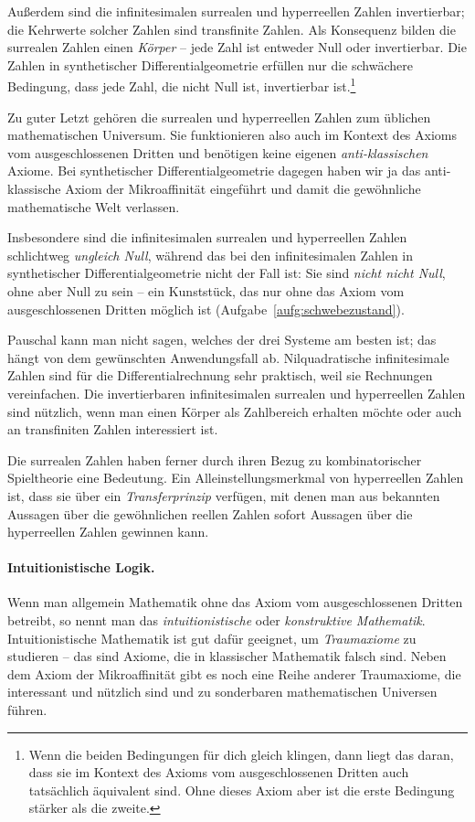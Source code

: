 \documentclass[twoside]{../zirkelblatt}
\theoremstyle{definition}
\theoremstyle{plain}
\theoremstyle{remark}
\begin{document}
Außerdem sind die infinitesimalen surrealen und hyperreellen Zahlen
invertierbar; die Kehrwerte solcher Zahlen sind transfinite Zahlen. Als
Konsequenz bilden die surrealen Zahlen einen \emph{Körper} -- jede Zahl ist
entweder Null oder invertierbar. Die Zahlen in synthetischer
Differentialgeometrie erfüllen nur die schwächere Bedingung, dass jede Zahl, die
nicht Null ist, invertierbar ist.\footnote{Wenn die beiden Bedingungen für dich
gleich klingen, dann liegt das daran, dass sie im Kontext des Axioms vom
ausgeschlossenen Dritten auch tatsächlich äquivalent sind. Ohne dieses Axiom
aber ist die erste Bedingung stärker als die zweite.}

Zu guter Letzt gehören die surrealen und hyperreellen Zahlen zum üblichen
mathematischen Universum. Sie funktionieren also auch im Kontext des Axioms vom
ausgeschlossenen Dritten und benötigen keine eigenen \emph{anti-klassischen}
Axiome. Bei synthetischer Differentialgeometrie dagegen haben wir ja das
anti-klassische Axiom der Mikroaffinität eingeführt und damit die gewöhnliche
mathematische Welt verlassen.

Insbesondere sind die infinitesimalen surrealen
und hyperreellen Zahlen schlichtweg \emph{ungleich Null}, während das bei den
infinitesimalen Zahlen in synthetischer Differentialgeometrie nicht der Fall
ist: Sie sind \emph{nicht nicht Null}, ohne aber Null zu sein -- ein
Kunststück, das nur ohne das Axiom vom ausgeschlossenen Dritten möglich ist
(Aufgabe~\ref{aufg:schwebezustand}).

Pauschal kann man nicht sagen, welches der drei Systeme am besten ist; das
hängt von dem gewünschten Anwendungsfall ab. Nilquadratische infinitesimale
Zahlen sind für die Differentialrechnung sehr praktisch, weil sie Rechnungen
vereinfachen. Die invertierbaren infinitesimalen surrealen und hyperreellen
Zahlen sind nützlich, wenn man einen Körper als Zahlbereich erhalten möchte
oder auch an transfiniten Zahlen interessiert ist.

Die surrealen Zahlen haben ferner durch ihren Bezug zu kombinatorischer Spieltheorie
eine Bedeutung. Ein Alleinstellungsmerkmal von hyperreellen Zahlen ist, dass
sie über ein \emph{Transferprinzip} verfügen, mit denen man aus bekannten
Aussagen über die gewöhnlichen reellen Zahlen sofort Aussagen über die
hyperreellen Zahlen gewinnen kann.


\paragraph{Intuitionistische Logik.}
Wenn man allgemein Mathematik ohne das Axiom vom ausgeschlossenen
Dritten betreibt, so nennt man das \emph{intuitionistische} oder
\emph{konstruktive Mathematik}. Intuitionistische Mathematik ist gut dafür
geeignet, um \emph{Traumaxiome} zu studieren -- das sind Axiome, die in
klassischer Mathematik falsch sind. Neben dem Axiom der Mikroaffinität gibt es
noch eine Reihe anderer Traumaxiome, die interessant und nützlich sind und
zu sonderbaren mathematischen Universen führen.
\end{document}
